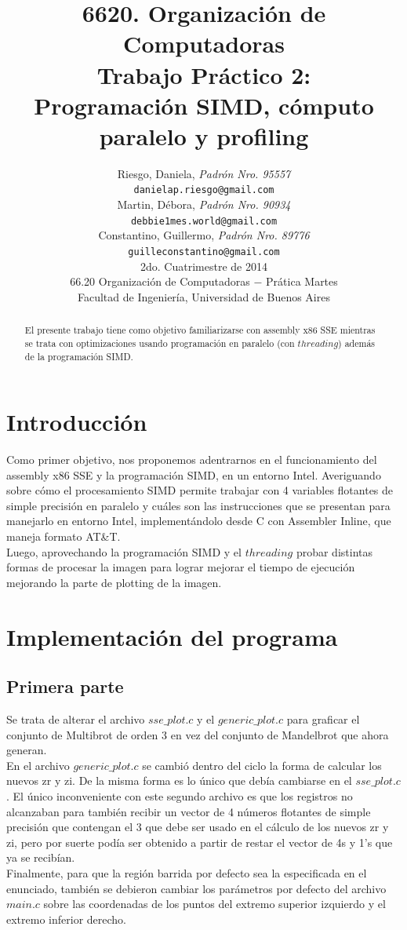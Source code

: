 \documentclass[a4paper,10pt]{article}
\title{ \textbf{ 6620. Organizaci\'on de Computadoras\\
Trabajo Pr\'actico 2: \\
Programación SIMD, cómputo paralelo y profiling}}
\author{ Riesgo, Daniela, \textit{Padr\'on Nro. 95557} \\
\texttt{ danielap.riesgo@gmail.com } \\[2.5ex]
Martin, D\'ebora, \textit{Padr\'on Nro. 90934} \\
\texttt{ debbie1mes.world@gmail.com } \\[2.5ex]
Constantino, Guillermo, \textit{Padr\'on Nro. 89776} \\
\texttt{ guilleconstantino@gmail.com } \\[2.5ex]
\normalsize{2do. Cuatrimestre de 2014} \\
\normalsize{66.20 Organizaci\'on de Computadoras $-$ Pr\'atica Martes} \\
\normalsize{Facultad de Ingenier\'ia, Universidad de Buenos Aires} \\
}
\date{}
\begin{document}
\maketitle
\thispagestyle{empty} %

\begin{abstract}
El presente trabajo tiene como objetivo familiarizarse con assembly x86 SSE mientras se trata con optimizaciones usando programación en paralelo (con $threading$) además de la programación SIMD.

\end{abstract}

\cleardoublepage
\setcounter{page}{0}
\newpage
\tableofcontents
\newpage





\section{Introducci\'on}
Como primer objetivo, nos proponemos adentrarnos en el funcionamiento del assembly x86 SSE y la programación SIMD, en un entorno Intel. Averiguando sobre cómo el procesamiento SIMD permite trabajar con 4 variables flotantes de simple precisión en paralelo y cuáles son las instrucciones que se presentan para manejarlo en entorno Intel, implementándolo desde C con Assembler Inline, que maneja formato AT\&T.\\
Luego, aprovechando la programación SIMD y el $threading$ probar distintas formas de procesar la imagen para lograr mejorar el tiempo de ejecución mejorando la parte de plotting de la imagen.




\section{Implementación del programa}

\subsection{Primera parte}
Se trata de alterar el archivo $sse\_plot.c$ y el $generic\_plot.c$ para graficar el conjunto de Multibrot de orden 3 en vez del conjunto de Mandelbrot que ahora generan.\\
En el archivo $generic\_plot.c$ se cambió dentro del ciclo la forma de calcular los nuevos zr y zi. De la misma forma es lo único que debía cambiarse en el $sse\_plot.c$. El único inconveniente con este segundo archivo es que los registros no alcanzaban para también recibir un vector de 4 números flotantes de simple precisión que contengan el 3 que debe ser usado en el cálculo de los nuevos zr y zi, pero por suerte podía ser obtenido a partir de restar el vector de 4s y 1's que ya se recibían.\\
Finalmente, para que la región barrida por defecto sea la especificada en el enunciado, también se debieron cambiar los parámetros por defecto del archivo $main.c$ sobre las coordenadas de los puntos del extremo superior izquierdo y el extremo inferior derecho.
\end{document}
